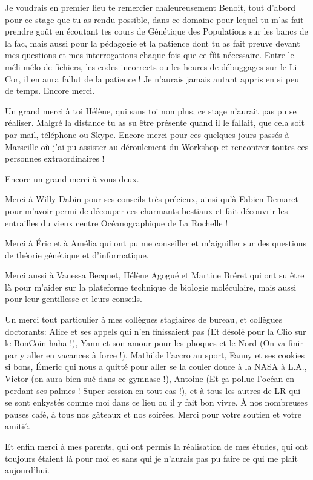 \documentclass[a4paper,12pt,twoside]{article}\usepackage[]{graphicx}\usepackage[]{color}
\begin{document}
Je voudrais en premier lieu te remercier chaleureusement Benoit, tout d'abord pour ce stage que tu as rendu possible, dans ce domaine pour lequel tu m'as fait prendre goût en écoutant tes cours de Génétique des Populations sur les bancs de la fac, mais aussi pour la pédagogie et la patience dont tu as fait preuve devant mes questions et mes interrogations chaque fois que ce fût nécessaire. Entre le méli-mélo de fichiers, les codes incorrects ou les heures de débuggages sur le Li-Cor, il en aura fallut de la patience ! Je n'aurais jamais autant appris en si peu de temps. Encore merci.
 
Un grand merci à toi Hélène, qui sans toi non plus, ce stage n'aurait pas pu se réaliser. Malgré la distance tu as su être présente quand il le fallait, que cela soit par mail, téléphone ou Skype. Encore merci pour ces quelques jours passés à Marseille où j'ai pu assister au déroulement du Workshop et rencontrer toutes ces personnes extraordinaires !

Encore un grand merci à vous deux.

Merci à Willy Dabin pour ses conseils très précieux, ainsi qu'à Fabien Demaret pour m'avoir permi de découper ces charmants bestiaux et fait découvrir les entrailles du vieux centre Océanographique de La Rochelle !

Merci à Éric et à Amélia qui ont pu me conseiller et m'aiguiller sur des questions de théorie génétique et d'informatique.

Merci aussi à Vanessa Becquet, Hélène Agogué et Martine Bréret qui ont su être là pour m'aider sur la plateforme technique de biologie moléculaire, mais aussi pour leur gentillesse et leurs conseils.

Un merci tout particulier à mes collègues stagiaires de bureau, et collègues doctorants: Alice et ses appels qui n'en finissaient pas (Et désolé pour la Clio sur le BonCoin haha !), Yann et son amour pour les phoques et le Nord (On va finir par y aller en vacances à force !), Mathilde l'accro au sport, Fanny et ses cookies si bons, Émeric qui nous a quitté pour aller se la couler douce à la NASA à L.A., Victor (on aura bien sué dans ce gymnase !), Antoine (Et ça pollue l'océan en perdant ses palmes ! Super session en tout cas !), et à tous les autres de LR qui se sont enkystés comme moi dans ce lieu ou il y fait bon vivre. À nos nombreuses pauses café, à tous nos gâteaux et nos soirées. Merci pour votre soutien et votre amitié.

Et enfin merci à mes parents, qui ont permis la réalisation de mes études, qui ont toujours étaient là pour moi et sans qui je n'aurais pas pu faire ce qui me plait aujourd'hui.
\end{document}

